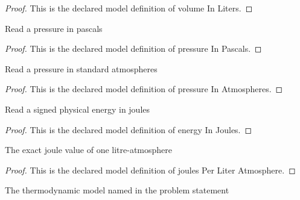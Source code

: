\begin{proof}
  This is the declared model definition of volume In Liters.
\end{proof}
\begin{definition}
  \label{def:physics:phyx-mini-0337:phyxminiproblems-problemphyxmini0337-pressureinpascals}
  Read a pressure in pascals
\end{definition}
\begin{proof}
  This is the declared model definition of pressure In Pascals.
\end{proof}
\begin{definition}
  \label{def:physics:phyx-mini-0337:phyxminiproblems-problemphyxmini0337-pressureinatmospheres}
  Read a pressure in standard atmospheres
\end{definition}
\begin{proof}
  This is the declared model definition of pressure In Atmospheres.
\end{proof}
\begin{definition}
  \label{def:physics:phyx-mini-0337:phyxminiproblems-problemphyxmini0337-energyinjoules}
  Read a signed physical energy in joules
\end{definition}
\begin{proof}
  This is the declared model definition of energy In Joules.
\end{proof}
\begin{definition}
  \label{def:physics:phyx-mini-0337:phyxminiproblems-problemphyxmini0337-joulesperliteratmosphere}
  The exact joule value of one litre-atmosphere
\end{definition}
\begin{proof}
  This is the declared model definition of joules Per Liter Atmosphere.
\end{proof}
\begin{definition}
  \label{def:physics:phyx-mini-0337:phyxminiproblems-problemphyxmini0337-gasmodel}
  The thermodynamic model named in the problem statement
\end{definition}
